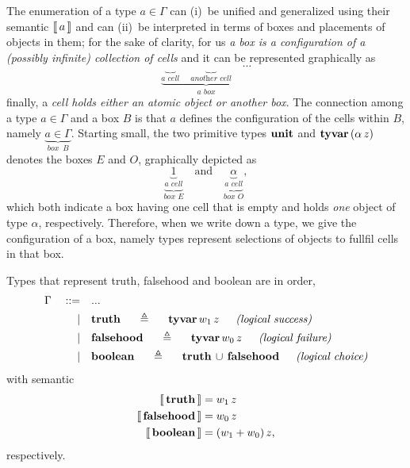 The enumeration of a type $a\in\Gamma$ can (i)~be unified and generalized using
their semantic $\left\llbracket\,a\,\right\rrbracket$ and can (ii)~be interpreted in terms of boxes and
placements of objects in them; for the sake of clarity, for us \textit{a box is
a configuration of a (possibly infinite) collection of cells} and it can be represented graphically as
\begin{displaymath}
\underbrace{\underbrace{\quad}_{\textit{a cell}}\quad\underbrace{\quad}_{\textit{another cell}}\quad\cdots}_{\textit{a box}}
\end{displaymath}
finally, a \textit{cell holds either an atomic object or another box}. The
connection among a type $a\in\Gamma$ and a box $B$ is that $a$ defines the
configuration of the cells within $B$, namely $\displaystyle
\underbrace{a\in\Gamma}_{\textit{box }\,B}$.  Starting small, the two primitive types
$\textbf{unit}$ and $\textbf{tyvar}\,(\alpha\,z)$ denotes the boxes $E$ and $O$, graphically depicted as
\begin{displaymath}
\underbrace{\underbrace{1}_{\textit{a cell}}}_{\textit{box E}}\quad\text{and}\quad
\underbrace{\underbrace{\alpha}_{\textit{a cell}}}_{\textit{box O}},
\end{displaymath}
which both indicate a box having one cell that is empty and holds \textit{one}
object of type $\alpha$, respectively.  Therefore, when we write down a type,
we give the configuration of a box, namely types represent selections of
objects to fullfil cells in that box.

\begin{definition}[\tytruth, \tyfalsehood, \tyboolean]
Types that represent truth, falsehood and boolean are in order,
\begin{displaymath}
\begin{split}
    \Gamma\quad::=\quad&... \\
           |\quad&\tydef{\tytruth}{\tyvar{w_{1}\,z}}{logical success}\\
           |\quad&\tydef{\tyfalsehood}{\tyvar{w_{0}\,z}}{logical failure}\\
           |\quad&\tydef{\tyboolean}{\tydu{\tytruth}{\tyfalsehood}}{logical choice}\\
\end{split}
\end{displaymath}
with semantic
\begin{displaymath}
\begin{split}
    \left\llbracket\,\textbf{truth}\,\right\rrbracket &= w_{1}\,z\\
    \left\llbracket\,\textbf{falsehood}\,\right\rrbracket &= w_{0}\,z\\
    \left\llbracket\,\textbf{boolean}\,\right\rrbracket &= (w_{1} + w_{0})\,z,
\end{split}
\end{displaymath}
respectively.
\end{definition}

